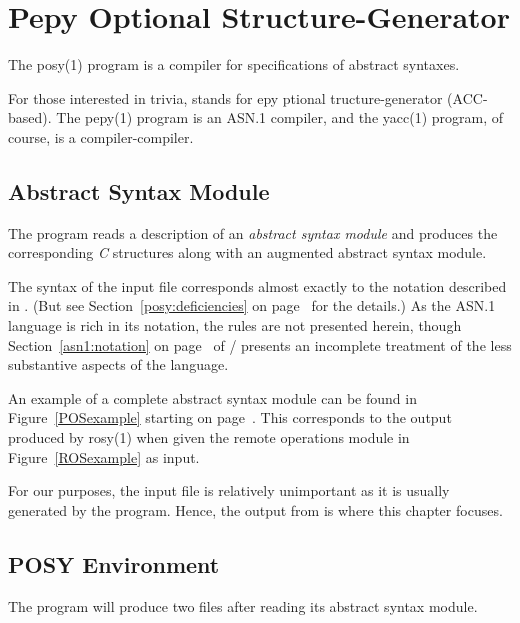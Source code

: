 
\chapter	{Pepy Optional Structure-Generator}\label{posy}
The \man posy(1) program is a compiler for specifications of abstract
syntaxes.

For those interested in trivia,
 stands for
epy
ptional
tructure-generator
(ACC-based).
The \man pepy(1) program is an ASN.1 compiler,
and the \man yacc(1) program,
of course,
is a compiler-compiler.

\section	{Abstract Syntax Module}
The  program reads a description of an {\em abstract syntax
module\/}
and produces the corresponding {\em C\/} structures along with an augmented
abstract syntax module.

The syntax of the input file corresponds almost exactly to the notation
described in \cite{ISO.PP.Syntax,CCITT.PP.Syntax}.
(But see Section~\ref{posy:deficiencies} on page~\pageref{posy:deficiencies}
for the details.)
As the ASN.1 language is rich in its notation,
the rules are not presented herein,
though Section~\ref{asn1:notation} on page~\pageref{asn1:notation} of \volone/
presents an incomplete treatment of the less substantive aspects of the
language.

An example of a complete abstract syntax module can be found in
Figure~\ref{POSexample} starting on page~\pageref{POSexample}.
This corresponds to the output produced by \man rosy(1) when given
the remote operations module in Figure~\ref{ROSexample} as input.

For our purposes,
the input file is relatively unimportant as it is usually generated by the
 program.
Hence,
the output from  is where this chapter focuses.

\newpage
{}
\newpage

\section	{POSY Environment}
The  program will produce two files after reading its abstract
syntax module.

